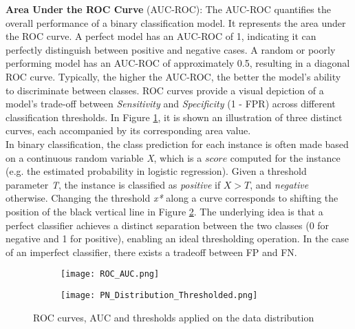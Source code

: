 \textbf{Area Under the ROC Curve} (AUC-ROC):
The AUC-ROC quantifies the overall performance of a binary classification model. It represents the area under the ROC curve.
A perfect model has an AUC-ROC of 1, indicating it can perfectly distinguish between positive and negative cases.
A random or poorly performing model has an AUC-ROC of approximately 0.5, resulting in a diagonal ROC curve.
Typically, the higher the AUC-ROC, the better the model's ability to discriminate between classes.
ROC curves provide a visual depiction of a model's trade-off between \textit{Sensitivity} and \textit{Specificity} (1 - FPR) across different classification thresholds.
In Figure \ref{fig:ROC_AUC}, it is shown an illustration of three distinct curves, each accompanied by its corresponding area value.\\

In binary classification, the class prediction for each instance is often made based on a continuous random variable \textit{X}, which is a $score$ computed for the instance (e.g. the estimated probability in logistic regression). 
Given a threshold parameter \textit{T}, the instance is classified as \textit{positive} if $X > T$, and \textit{negative} otherwise. 
Changing the threshold \textit{x*} along a curve corresponds to shifting the position of the black vertical line in Figure \ref{fig:PNDistribution}. 
The underlying idea is that a perfect classifier achieves a distinct separation between the two classes (0 for negative and 1 for positive), enabling an ideal thresholding operation.
In the case of an imperfect classifier, there exists a tradeoff between FP and FN.
\begin{figure}[H]
  \centering
  \begin{subfigure}{0.8\linewidth}
    \texttt{[image: ROC\_AUC.png]}
    \caption{}
    \label{fig:ROC_AUC}
  \end{subfigure}
  \begin{subfigure}{0.8\linewidth}
    \texttt{[image: PN\_Distribution\_Thresholded.png]}
    \caption{}
    \label{fig:PNDistribution}
  \end{subfigure}
  \caption{ROC curves, AUC and thresholds applied on the data distribution}
  \label{fig:ROC}
\end{figure}